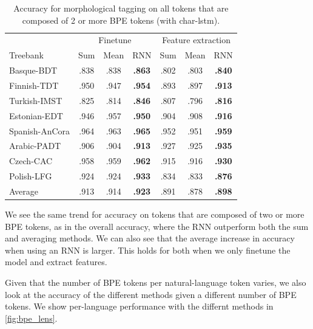 \documentclass[11pt]{article}
\begin{document}
    
	\begin{table}%
	\centering
	\begin{tabular}{l|ccc|ccc}
		 & \multicolumn{3}{c}{Finetune} & \multicolumn{3}{c}{Feature extraction} \\
		Treebank & Sum & Mean & RNN & Sum & Mean & RNN  \\
		 \hline
        Basque-BDT      & .838 & .838 & \textbf{.863} & .802 & .803 & \textbf{.840} \\
		Finnish-TDT     & .950 & .947 & \textbf{.954} & .893 & .897 & \textbf{.913} \\ 
		Turkish-IMST    & .825 & .814 & \textbf{.846} & .807 & .796 & \textbf{.816} \\
		Estonian-EDT    & .946 & .957 & \textbf{.950} & .904 & .908 & \textbf{.916} \\
		Spanish-AnCora  & .964 & .963 & \textbf{.965} & .952 & .951 & \textbf{.959} \\
		Arabic-PADT     & .906 & .904 & \textbf{.913} & .927 & .925 & \textbf{.935}\\
		Czech-CAC       & .958 & .959 & \textbf{.962} & .915 & .916 & \textbf{.930} \\
		Polish-LFG      & .924 & .924 & \textbf{.933} & .834 & .833 & \textbf{.876} \\
        \hline
        Average         & .913 & .914 & \textbf{.923} & .891 & .878 & \textbf{.898} \\
	\end{tabular}
	\caption{\label{tab:results_large_tokens} Accuracy for morphological tagging on all tokens that are composed of 2 or more BPE tokens (with char-lstm).}
\end{table}

            We see the same trend for accuracy on tokens that are
     composed of two or more BPE tokens, as in the overall accuracy,
     where the RNN outperform both the sum and averaging methods. We
     can also see that the average increase in accuracy when using an
     RNN is larger. This holds for both when we only finetune the
     model and extract features.

    
    Given that the number of BPE tokens per natural-language token
     varies, we also look at the accuracy of the different methods
     given a different number of BPE tokens. We show per-language
     performance with the differnt methods in \cref{fig:bpe_lens}.
\end{document}
